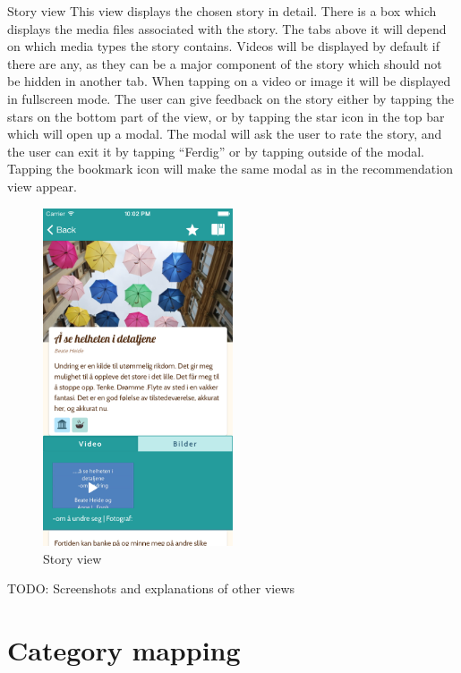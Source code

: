 Story view\newline
This view displays the chosen story in detail. There is a box which displays the media files associated with the story. The tabs above it will depend on which media types the story contains. Videos will be displayed by default if there are any, as they can be a major component of the story which should not be hidden in another tab. When tapping on a video or image it will be displayed in fullscreen mode. The user can give feedback on the story either by tapping the stars on the bottom part of the view, or by tapping the star icon in the top bar which will open up a modal. The modal will ask the user to rate the story, and the user can exit it by tapping “Ferdig” or by tapping outside of the modal. Tapping the bookmark icon will make the same modal as in the recommendation view appear.

\begin{figure}[h!]
	\centering
	\includegraphics[width=0.5\textwidth]{fig/story_view}
	\caption{Story view}
	\label{Fig:story_view}
\end{figure}

TODO: Screenshots and explanations of other views

\section{Category mapping} 
\label{sec:categorymapping}

